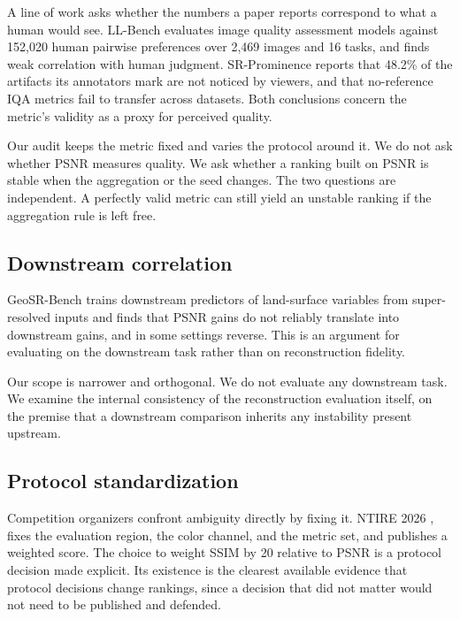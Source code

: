 \documentclass[pdflatex,sn-nature]{sn-jnl}
\begin{document}
A line of work asks whether the numbers a paper reports correspond to what a human would see. LL-Bench \cite{ref1} evaluates image quality assessment models against 152,020 human pairwise preferences over 2,469 images and 16 tasks, and finds weak correlation with human judgment. SR-Prominence \cite{ref2} reports that 48.2\% of the artifacts its annotators mark are not noticed by viewers, and that no-reference IQA metrics fail to transfer across datasets. Both conclusions concern the metric's validity as a proxy for perceived quality.

Our audit keeps the metric fixed and varies the protocol around it. We do not ask whether PSNR measures quality. We ask whether a ranking built on PSNR is stable when the aggregation or the seed changes. The two questions are independent. A perfectly valid metric can still yield an unstable ranking if the aggregation rule is left free.

\subsection{Downstream correlation}\label{sec:downstream}

GeoSR-Bench \cite{ref3} trains downstream predictors of land-surface variables from super-resolved inputs and finds that PSNR gains do not reliably translate into downstream gains, and in some settings reverse. This is an argument for evaluating on the downstream task rather than on reconstruction fidelity.

Our scope is narrower and orthogonal. We do not evaluate any downstream task. We examine the internal consistency of the reconstruction evaluation itself, on the premise that a downstream comparison inherits any instability present upstream.

\subsection{Protocol standardization}\label{sec:standard}

Competition organizers confront ambiguity directly by fixing it. NTIRE 2026 \cite{ref4}, \cite{ref5} fixes the evaluation region, the color channel, and the metric set, and publishes a weighted score. The choice to weight SSIM by 20 relative to PSNR is a protocol decision made explicit. Its existence is the clearest available evidence that protocol decisions change rankings, since a decision that did not matter would not need to be published and defended.
\end{document}

